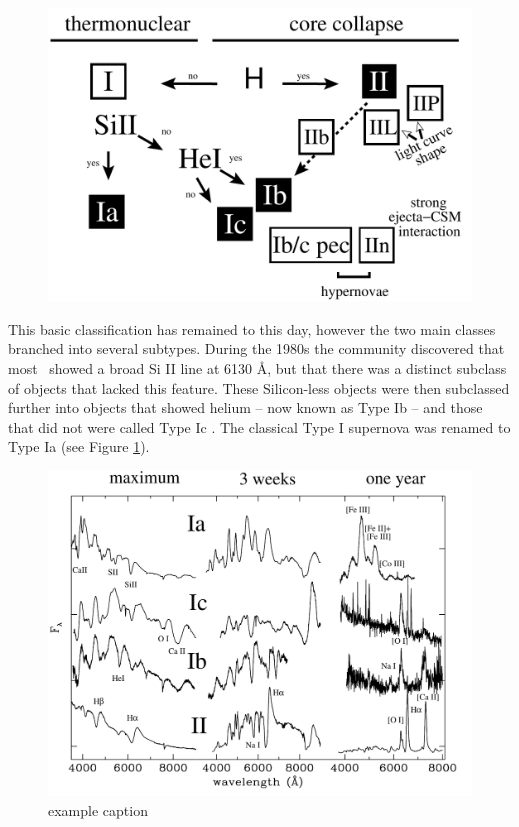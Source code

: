 \begin{figure}[htbp] %
   \centering
   \includegraphics[width=\textwidth]{chapter1/plots/sn_classification.pdf} 
   \caption{}
   \label{fig:sn_classification}
\end{figure}

This basic classification has remained to this day, however the two main classes branched into several subtypes.
During the 1980s the community discovered that most \sneia\ showed a broad Si II line at 6130 \AA, but that there was a distinct subclass of objects that lacked this feature. These Silicon-less objects were then subclassed further into objects that showed helium -- now known as Type Ib --  and those that did not were called Type Ic \citep{1987ApJ...317..355H, 1986ApJ...306L..77G}. The classical Type I supernova was renamed to Type Ia (see Figure \ref{fig:sn_classification}). 

\begin{figure}[htbp] %
   \centering
   \includegraphics[width=\textwidth]{chapter1/plots/sn_class_spectra.pdf} 
   \caption{example caption}
   \label{fig:sn_class_spectra}
\end{figure}

